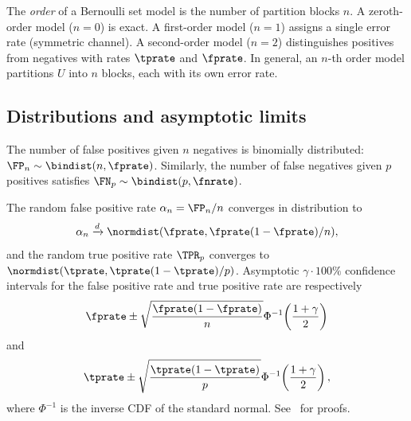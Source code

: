 \begin{definition}
\label{def:model_order}
The \emph{order} of a Bernoulli set model is the number of partition blocks $n$.
A zeroth-order model ($n = 0$) is exact.
A first-order model ($n = 1$) assigns a single error rate (symmetric channel).
A second-order model ($n = 2$) distinguishes positives from negatives with rates $\tprate$ and $\fprate$.
In general, an $n$-th order model partitions $U$ into $n$ blocks, each with its own error rate.
\end{definition}

\subsection{Distributions and asymptotic limits}

The number of false positives given $n$ negatives is binomially distributed: $\FP_n \sim \bindist(n, \fprate)$.
Similarly, the number of false negatives given $p$ positives satisfies $\FN_p \sim \bindist(p, \fnrate)$.

The random false positive rate $\alpha_n = \FP_n / n$ converges in distribution to
\begin{equation}
\label{eq:fpr_clt}
    \alpha_n \xrightarrow{d} \normdist(\fprate, \fprate(1-\fprate) / n),
\end{equation}
and the random true positive rate $\TPR_p$ converges to $\normdist(\tprate, \tprate(1-\tprate) / p)$.
Asymptotic $\gamma \cdot 100\%$ confidence intervals for the false positive rate and true positive rate are respectively
\begin{equation}
\label{eq:conf_fpr}
\fprate \pm \sqrt{\frac{\fprate(1-\fprate)}{n}} \Phi^{-1}\!\left(\frac{1+\gamma}{2}\right)
\end{equation}
and
\begin{equation}
\label{eq:conf_tpr}
\tprate \pm \sqrt{\frac{\tprate(1-\tprate)}{p}} \Phi^{-1}\!\left(\frac{1+\gamma}{2}\right),
\end{equation}
where $\Phi^{-1}$ is the inverse CDF of the standard normal.
See~\cite{bernoulliSets} for proofs.
